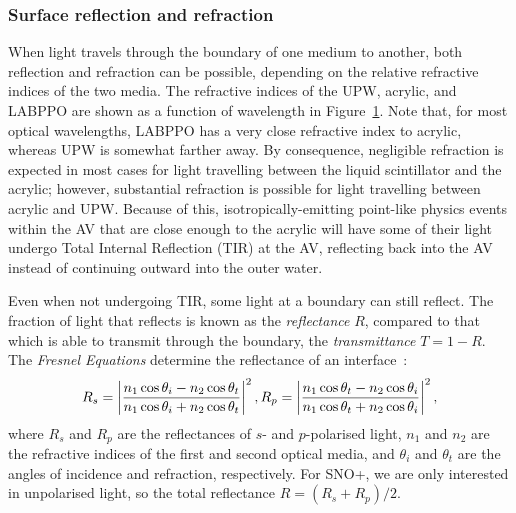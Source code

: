 \subsubsection{Surface reflection and refraction}
When light travels through the boundary of one medium to another, both reflection and refraction can be possible, depending on the relative refractive indices of the two media. The refractive indices of the UPW, acrylic, and LABPPO are shown as a function of wavelength in Figure~\ref{fig:ref_indices_snoplus}. Note that, for most optical wavelengths, LABPPO has a very close refractive index to acrylic, whereas UPW is somewhat farther away. By consequence, negligible refraction is expected in most cases for light travelling between the liquid scintillator and the acrylic; however, substantial refraction is possible for light travelling between acrylic and UPW. Because of this, isotropically-emitting point-like physics events within the AV that are close enough to the acrylic will have some of their light undergo Total Internal Reflection (TIR) at the AV, reflecting back into the AV instead of continuing outward into the outer water.

\begin{figure}
    \centering
    \caption[]{}
    \label{fig:ref_indices_snoplus}
\end{figure}

Even when not undergoing TIR, some light at a boundary can still reflect. The fraction of light that reflects is known as the \textit{reflectance} $R$, compared to that which is able to transmit through the boundary, the \textit{transmittance} $T=1-R$. The \textit{Fresnel Equations} determine the reflectance of an interface~\cite{}:%
\begin{equation}
    R_{s} = \left|\frac{n_{1}\cos{\theta_{i}}-n_{2}\cos{\theta_{t}}}{n_{1}\cos{\theta_{i}}+n_{2}\cos{\theta_{t}}}\right|^{2},\\
    R_{p} = \left|\frac{n_{1}\cos{\theta_{t}}-n_{2}\cos{\theta_{i}}}{n_{1}\cos{\theta_{t}}+n_{2}\cos{\theta_{i}}}\right|^{2},
\end{equation}
where $R_{s}$ and $R_{p}$ are the reflectances of $s$- and $p$-polarised light, $n_{1}$ and $n_{2}$ are the refractive indices of the first and second optical media, and $\theta_{i}$ and $\theta_{t}$ are the angles of incidence and refraction, respectively. For SNO+, we are only interested in unpolarised light, so the total reflectance $R = \left(R_{s}+R_{p}\right)/2$.

